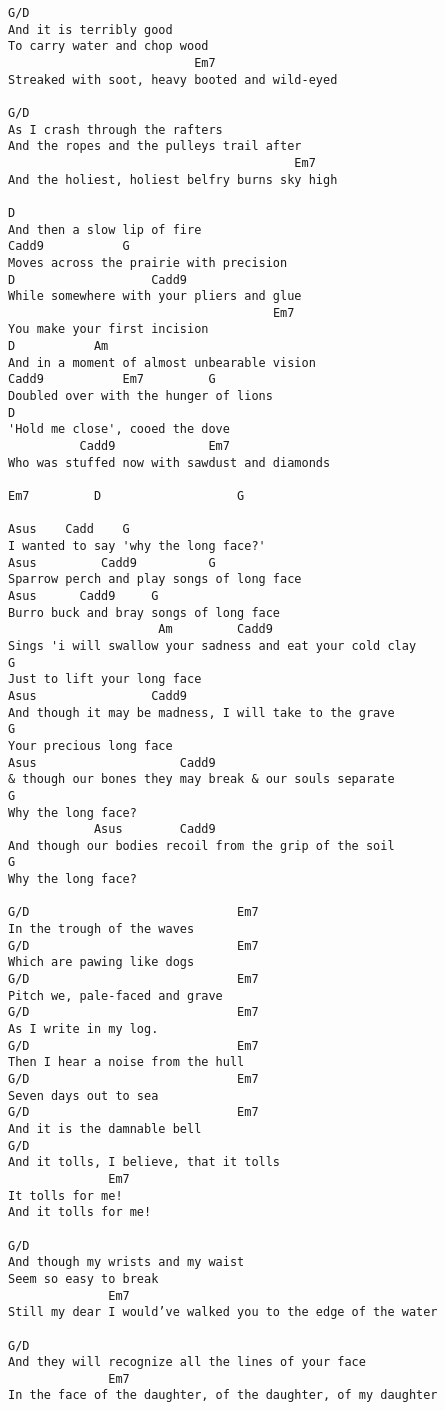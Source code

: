 \documentclass[leqno]{memoir}
\begin{document}
\begin{verbatim}
G/D  
And it is terribly good 
To carry water and chop wood 
                          Em7 
Streaked with soot, heavy booted and wild-eyed 

G/D  
As I crash through the rafters 
And the ropes and the pulleys trail after 
                                        Em7 
And the holiest, holiest belfry burns sky high 

D 
And then a slow lip of fire 
Cadd9			G	 
Moves across the prairie with precision 
D 					Cadd9 
While somewhere with your pliers and glue 
                                     Em7	 
You make your first incision 
D			Am 
And in a moment of almost unbearable vision 
Cadd9 			Em7			G 
Doubled over with the hunger of lions 
D 
'Hold me close', cooed the dove 
          Cadd9				Em7 
Who was stuffed now with sawdust and diamonds 

Em7 		D   				G 

Asus 	Cadd  	G 
I wanted to say 'why the long face?' 
Asus	     Cadd9			G 
Sparrow perch and play songs of long face 
Asus      Cadd9		G 
Burro buck and bray songs of long face 
                     Am			Cadd9 
Sings 'i will swallow your sadness and eat your cold clay 
G 
Just to lift your long face 
Asus				Cadd9 
And though it may be madness, I will take to the grave 
G 
Your precious long face 
Asus 					Cadd9 
& though our bones they may break & our souls separate 
G 
Why the long face?  
			Asus		Cadd9 
And though our bodies recoil from the grip of the soil 
G 
Why the long face? 

G/D                             Em7 
In the trough of the waves 
G/D                             Em7 
Which are pawing like dogs 
G/D                             Em7 
Pitch we, pale-faced and grave 
G/D                             Em7 
As I write in my log. 
G/D                             Em7 
Then I hear a noise from the hull 
G/D                             Em7 
Seven days out to sea 
G/D                             Em7 
And it is the damnable bell 
G/D                              
And it tolls, I believe, that it tolls 
              Em7 
It tolls for me!         
And it tolls for me! 

G/D                              
And though my wrists and my waist 
Seem so easy to break 
              Em7 
Still my dear I would’ve walked you to the edge of the water 

G/D                              
And they will recognize all the lines of your face 
              Em7 
In the face of the daughter, of the daughter, of my daughter 


\end{verbatim}
\end{document}
